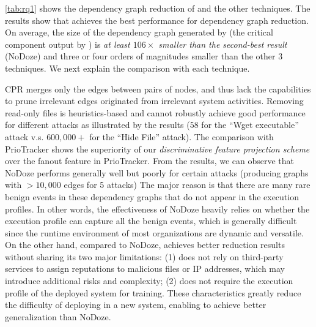 \cref{tab:rq1} shows the dependency graph reduction of \tool and the other techniques.
The results show that \tool achieves the best performance for dependency graph reduction. 
On average, the size of the dependency graph generated by \tool (\ie the critical component output by \tool) is \emph{at least $106\times$ smaller than the second-best result} (\ie NoDoze) and three or four orders of magnitudes smaller than the other 3 techniques.
We next explain the comparison with each technique.

CPR merges only the edges between pairs of nodes, and thus lack the capabilities to prune irrelevant edges originated from irrelevant system activities.
Removing read-only files is heuristics-based and cannot robustly achieve good performance for different attacks as illustrated by the results (\eg $58$ for the ``Wget executable'' attack v.s. $600,000+$ for the ``Hide File'' attack).
The comparison with PrioTracker shows the superiority of our \textit{discriminative feature projection scheme} over the fanout feature in PrioTracker.
From the results, we can observe that NoDoze  performs generally well but poorly for certain attacks (\eg producing graphs with $>10,000$ edges for 5 attacks)
The major reason is that there are many rare benign events in these dependency graphs that do not appear in the execution profiles.
In other words, the effectiveness of NoDoze heavily relies on whether the execution profile can capture all the benign events, which is generally difficult since the runtime environment of most organizations are dynamic and versatile.
%
On the other hand, compared to NoDoze, \tool achieves better reduction results without sharing its two major limitations:
(1) \tool does not rely on third-party services to assign reputations to malicious files or IP addresses, which may introduce additional risks and complexity;
(2) \tool does not require the execution profile of the deployed system for training. 
These characteristics greatly reduce the difficulty of deploying \tool in a new system, enabling \tool to achieve better generalization than NoDoze.

